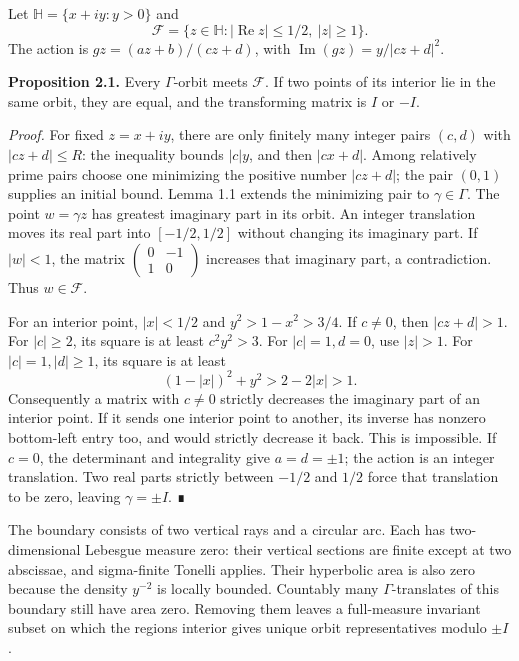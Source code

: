 \documentclass[
  english,
  11pt,
  a4paper,
]{article}
\begin{document}
Let \(\mathbb H=\{x+iy:y>0\}\) and
\[\mathcal F=\{z\in\mathbb H:|\operatorname{Re}z|\le1/2,\ |z|\ge1\}.
\tag{2.1}\] The action is \(gz=(az+b)/(cz+d)\), with
\(\operatorname{Im}(gz)=y/|cz+d|^2\).

\textbf{Proposition 2.1.} Every \(\Gamma\)-orbit meets \(\mathcal F\).
If two points of its interior lie in the same orbit, they are equal, and
the transforming matrix is \(I\) or \(-I\).

\emph{Proof.} For fixed \(z=x+iy\), there are only finitely many integer
pairs \((c,d)\) with \(|cz+d|\le R\): the inequality bounds \(|c|y\),
and then \(|cx+d|\). Among relatively prime pairs choose one minimizing
the positive number \(|cz+d|\); the pair \((0,1)\) supplies an initial
bound. Lemma 1.1 extends the minimizing pair to \(\gamma\in\Gamma\). The
point \(w=\gamma z\) has greatest imaginary part in its orbit. An
integer translation moves its real part into \([-1/2,1/2]\) without
changing its imaginary part. If \(|w|<1\), the matrix
\(\begin{pmatrix}0&-1\\1&0\end{pmatrix}\) increases that imaginary part,
a contradiction. Thus \(w\in\mathcal F\).

For an interior point, \(|x|<1/2\) and \(y^2>1-x^2>3/4\). If \(c\ne0\),
then \(|cz+d|>1\). For \(|c|\ge2\), its square is at least \(c^2y^2>3\).
For \(|c|=1,d=0\), use \(|z|>1\). For \(|c|=1,|d|\ge1\), its square is
at least \[(1-|x|)^2+y^2>2-2|x|>1.\] Consequently a matrix with
\(c\ne0\) strictly decreases the imaginary part of an interior point. If
it sends one interior point to another, its inverse has nonzero
bottom-left entry too, and would strictly decrease it back. This is
impossible. If \(c=0\), the determinant and integrality give
\(a=d=\pm1\); the action is an integer translation. Two real parts
strictly between \(-1/2\) and \(1/2\) force that translation to be zero,
leaving \(\gamma=\pm I\). ∎

The boundary consists of two vertical rays and a circular arc. Each has
two-dimensional Lebesgue measure zero: their vertical sections are
finite except at two abscissae, and sigma-finite Tonelli applies. Their
hyperbolic area is also zero because the density \(y^{-2}\) is locally
bounded. Countably many \(\Gamma\)-translates of this boundary still
have area zero. Removing them leaves a full-measure invariant subset on
which the region\textquotesingle s interior gives unique orbit
representatives modulo \(\pm I\).
\end{document}
